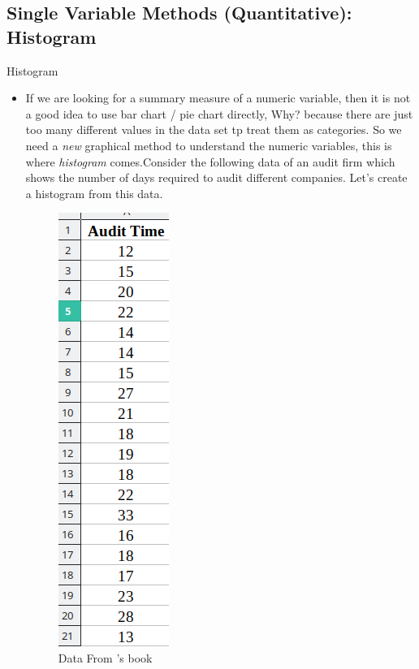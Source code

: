 \documentclass[8pt, usepdftitle=false]{beamer}
\begin{document}
\subsection{Single Variable Methods (Quantitative): Histogram}
\frame{\subsectionpage}

\begin{frame}[allowframebreaks]{Histogram}
\begin{itemize}

\item  If we are looking for a summary measure of a numeric variable, then it is not a good idea to use bar chart / pie chart directly, Why? because there are just too many different values in the data set tp treat them as categories.  So we need a \emph{new} graphical method to understand the numeric variables, this is where \emph{histogram} comes.Consider the following data of an audit firm which shows the number of days required to audit different companies. Let's create a histogram from this data.


\begin{figure}
  \caption{Data From \citet*{anderson_statistics_2020}'s book}
  \includegraphics[scale = .3]{Images/Audit_Data.png}
\end{figure}


\end{itemize}
\end{frame}
\end{document}
